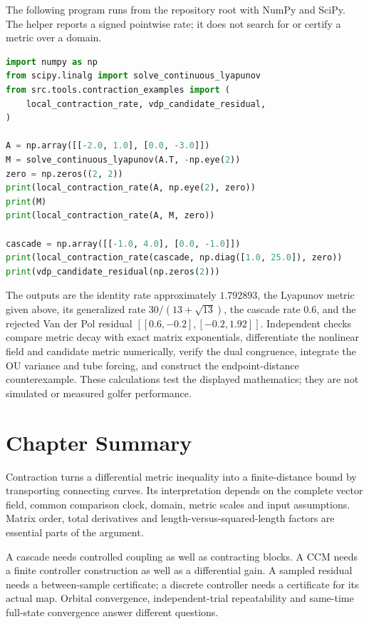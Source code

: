 The following program runs from the repository root with NumPy and SciPy. The helper reports a signed pointwise rate; it does not search for or certify a metric over a domain.
\begin{lstlisting}[language=Python]
import numpy as np
from scipy.linalg import solve_continuous_lyapunov
from src.tools.contraction_examples import (
    local_contraction_rate, vdp_candidate_residual,
)

A = np.array([[-2.0, 1.0], [0.0, -3.0]])
M = solve_continuous_lyapunov(A.T, -np.eye(2))
zero = np.zeros((2, 2))
print(local_contraction_rate(A, np.eye(2), zero))
print(M)
print(local_contraction_rate(A, M, zero))

cascade = np.array([[-1.0, 4.0], [0.0, -1.0]])
print(local_contraction_rate(cascade, np.diag([1.0, 25.0]), zero))
print(vdp_candidate_residual(np.zeros(2)))
\end{lstlisting}
The outputs are the identity rate approximately $1.792893$, the Lyapunov metric given above, its generalized rate $30/(13+\sqrt{13})$, the cascade rate $0.6$, and the rejected Van der Pol residual $[[0.6,-0.2],[-0.2,1.92]]$. Independent checks compare metric decay with exact matrix exponentials, differentiate the nonlinear field and candidate metric numerically, verify the dual congruence, integrate the OU variance and tube forcing, and construct the endpoint-distance counterexample. These calculations test the displayed mathematics; they are not simulated or measured golfer performance.

\section{Chapter Summary}

Contraction turns a differential metric inequality into a finite-distance bound by transporting connecting curves. Its interpretation depends on the complete vector field, common comparison clock, domain, metric scales and input assumptions. Matrix order, total derivatives and length-versus-squared-length factors are essential parts of the argument.

A cascade needs controlled coupling as well as contracting blocks. A CCM needs a finite controller construction as well as a differential gain. A sampled residual needs a between-sample certificate; a discrete controller needs a certificate for its actual map. Orbital convergence, independent-trial repeatability and same-time full-state convergence answer different questions.

